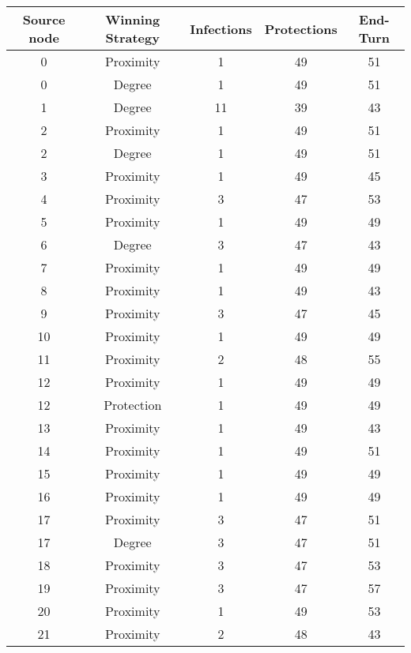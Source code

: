 \documentclass[results.tex]{subfiles}
\begin{document}
\begin{center}
  \begin{tabular}{| c || c | c | c | c |}
    \hline
    {\bfseries Source node} & {\bfseries Winning Strategy} & {\bfseries Infections} & {\bfseries Protections} & {\bfseries End-Turn} \\  %
    \hline\hline
    0 & Proximity & 1 & 49 & 51 \\ 
    \hline
    0 & Degree & 1 & 49 & 51 \\ 
    \hline
    1 & Degree & 11 & 39 & 43 \\ 
    \hline
    2 & Proximity & 1 & 49 & 51 \\ 
    \hline
    2 & Degree & 1 & 49 & 51 \\ 
    \hline
    3 & Proximity & 1 & 49 & 45 \\ 
    \hline
    4 & Proximity & 3 & 47 & 53 \\ 
    \hline
    5 & Proximity & 1 & 49 & 49 \\ 
    \hline
    6 & Degree & 3 & 47 & 43 \\ 
    \hline
    7 & Proximity & 1 & 49 & 49 \\ 
    \hline
    8 & Proximity & 1 & 49 & 43 \\ 
    \hline
    9 & Proximity & 3 & 47 & 45 \\ 
    \hline
    10 & Proximity & 1 & 49 & 49 \\ 
    \hline
    11 & Proximity & 2 & 48 & 55 \\ 
    \hline
    12 & Proximity & 1 & 49 & 49 \\ 
    \hline
    12 & Protection & 1 & 49 & 49 \\ 
    \hline
    13 & Proximity & 1 & 49 & 43 \\ 
    \hline
    14 & Proximity & 1 & 49 & 51 \\ 
    \hline
    15 & Proximity & 1 & 49 & 49 \\ 
    \hline
    16 & Proximity & 1 & 49 & 49 \\ 
    \hline
    17 & Proximity & 3 & 47 & 51 \\ 
    \hline
    17 & Degree & 3 & 47 & 51 \\ 
    \hline
    18 & Proximity & 3 & 47 & 53 \\ 
    \hline
    19 & Proximity & 3 & 47 & 57 \\ 
    \hline
    20 & Proximity & 1 & 49 & 53 \\ 
    \hline
    21 & Proximity & 2 & 48 & 43 \\ 

\end{tabular}
\end{center}
\end{document}
